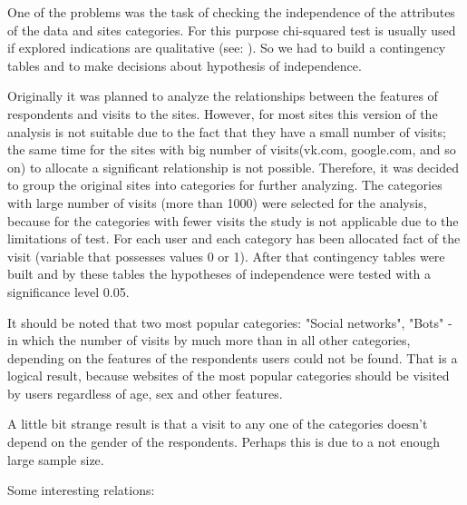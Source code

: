 \documentclass[runningheads,a4paper]{llncs}
\begin{document}
One of the problems was the task of checking the independence of the attributes of the data and sites categories. For this purpose chi-squared test is usually used if explored indications are qualitative (see: \cite{wiki_chisq}). So we had to build a contingency tables and to make decisions about hypothesis of independence.

Originally it was planned to analyze the relationships between the features of respondents and visits to the sites. However, for most sites this version of the analysis is not suitable due to the fact that they have a small number of visits; the same time for the sites with big number of visits(vk.com, google.com, and so on) to allocate a significant relationship is not possible. Therefore, it was decided to group the original sites into categories for further analyzing. The categories with large number of visits (more than 1000) were selected for the analysis, because for the categories with fewer visits the study is not applicable due to the limitations of test. For each user and each category has been allocated fact of the visit (variable that possesses values 0 or 1). After that contingency tables were built and by these tables the hypotheses of independence were tested with a significance level 0.05.

It should be noted that two most popular categories: "Social networks", "Bots" - in which the number of visits by much more than in all other categories, depending on the features of the respondents users could not be found. That is a logical result, because websites of the most popular categories should be visited by users regardless of age, sex and other features. 

A little bit strange result is that a visit to any one of the categories doesn’t depend on the gender of the respondents. Perhaps this is due to a not enough large sample size.

Some interesting relations:
\end{document}
